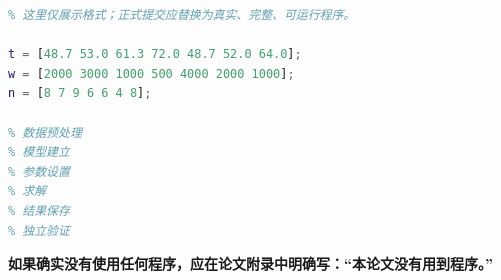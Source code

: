 \documentclass[12pt,a4paper]{article}
\newcommand{\tip}[1]{\par\noindent\textbf{【提示】} #1\par}
\begin{document}
\begin{lstlisting}[language=matlab,caption={MATLAB完整程序示例}]
% 正式比赛时不要使用“略去”“省略代码”等写法。
% 这里仅展示格式；正式提交应替换为真实、完整、可运行程序。

t = [48.7 53.0 61.3 72.0 48.7 52.0 64.0];
w = [2000 3000 1000 500 4000 2000 1000];
n = [8 7 9 6 6 4 8];

% 数据预处理
% 模型建立
% 参数设置
% 求解
% 结果保存
% 独立验证
\end{lstlisting}

\begin{center}
\textbf{如果确实没有使用任何程序，应在论文附录中明确写：\quad“本论文没有用到程序。”}
\end{center}



\end{document}
